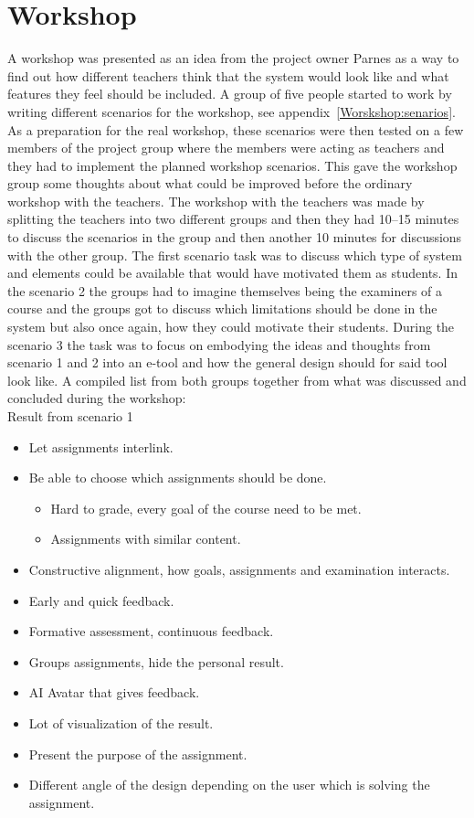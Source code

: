 \section{Workshop} 
A workshop was presented as an idea from the project owner Parnes as a way to find out how different teachers think that the system would look like and what features they feel should be included. A group of five people started to work by writing different scenarios for the workshop, see appendix~\ref{Worskshop:senarios}. As a preparation for the real workshop, these scenarios were then tested on a few members of the project group where the members were acting as teachers and they had to implement the planned workshop scenarios. This gave the workshop group some thoughts about what could be improved before the ordinary workshop with the teachers. 
The workshop with the teachers was made by splitting the teachers into two different groups and then they had 10--15 minutes to discuss the scenarios in the group and then another 10 minutes for discussions with the other group. 
The first scenario task was to discuss which type of system and elements could be available that would have motivated them as students. In the scenario 2 the groups had to imagine themselves being the examiners of a course and the groups got to discuss which limitations should be done in the system but also once again, how they could motivate their students. During the scenario 3 the task was to focus on embodying the ideas and thoughts from scenario 1 and 2 into an e-tool and how the general design should for said tool look like. A compiled list from both groups together from what was discussed and concluded during the workshop:
\\
Result from scenario 1
\begin{itemize}
\item Let assignments interlink.
\item Be able to choose which assignments should be done.
    \begin{itemize}
    \item Hard to grade, every goal of the course need to be met.
    \item Assignments with similar content.
    \end{itemize}
\item Constructive alignment, how goals, assignments and examination interacts.
\item Early and quick feedback.
\item Formative assessment, continuous feedback.
\item Groups assignments, hide the personal result.
\item AI Avatar that gives feedback.
\item Lot of visualization of the result.
\item Present the purpose of the assignment.
\item Different angle of the design depending on the user which is solving the assignment.
\end{itemize}

